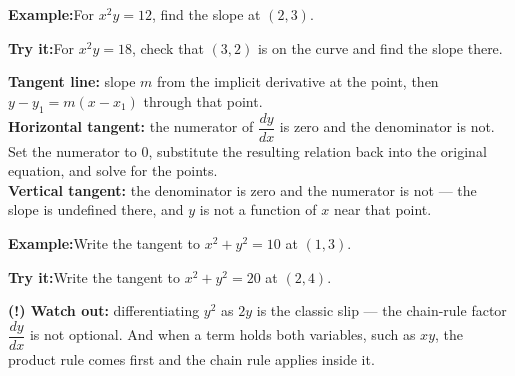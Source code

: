 \documentclass[12pt]{article}
\begin{document}
\begin{examplebox}
\textbf{Example:}\quad For $x^{2}y = 12$, find the slope at $(2, 3)$.
\end{examplebox}

\begin{tryitbox}
\textbf{Try it:}\quad For $x^{2}y = 18$, check that $(3, 2)$ is on the curve and
find the slope there.\\[2pt]
\end{tryitbox}


\begin{formulabox}
\textbf{Tangent line:} slope $m$ from the implicit derivative at the point, then
$y - y_1 = m(x - x_1)$ through that point.\\[3pt]
\textbf{Horizontal tangent:} the numerator of $\dfrac{dy}{dx}$ is zero and the
denominator is not. Set the numerator to 0, substitute the resulting relation back
into the original equation, and solve for the points.\\[3pt]
\textbf{Vertical tangent:} the denominator is zero and the numerator is not --- the
slope is undefined there, and $y$ is not a function of $x$ near that point.
\end{formulabox}

\begin{examplebox}
\textbf{Example:}\quad Write the tangent to $x^{2} + y^{2} = 10$ at $(1, 3)$.
\end{examplebox}

\begin{tryitbox}
\textbf{Try it:}\quad Write the tangent to $x^{2} + y^{2} = 20$ at $(2, 4)$.\\[2pt]
\end{tryitbox}

\begin{watchoutbox}
\textbf{(!) Watch out:} differentiating $y^{2}$ as $2y$ is the classic slip --- the
chain-rule factor $\dfrac{dy}{dx}$ is not optional. And when a term holds both
variables, such as $xy$, the product rule comes first and the chain rule applies
inside it.
\end{watchoutbox}
\end{document}
